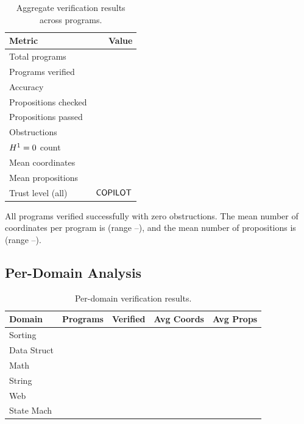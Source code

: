 \documentclass[11pt]{article}
\begin{document}
\begin{table}[H]
\centering
\caption{Aggregate verification results across \expTotalPrograms{}
  programs.}\label{tab:aggregate}
\begin{tabular}{@{}l r@{}}
\toprule
\textbf{Metric} & \textbf{Value} \\
\midrule
Total programs        & \expTotalPrograms{} \\
Programs verified     & \expVerified{} \\
Accuracy              & \expAccuracy{} \\
Propositions checked  & \expPropsSum{} \\
Propositions passed   & \expPropsOkSum{} \\
Obstructions          & \expObstructionTotal{} \\
$H^{1} = 0$ count  & \expHOneZero{} \\
Mean coordinates      & \expCoordsMean{} \\
Mean propositions     & \expPropsMean{} \\
Trust level (all)     & $\mathsf{COPILOT}$ \\
\bottomrule
\end{tabular}
\end{table}

All \expVerified{} programs verified successfully with zero
obstructions.  The mean number of coordinates per program is
\expCoordsMean{} (range \expCoordsMin{}--\expCoordsMax{}),
and the mean number of propositions is \expPropsMean{}
(range \expPropsMin{}--\expPropsMax{}).

\subsection{Per-Domain Analysis}

\begin{table}[H]
\centering
\caption{Per-domain verification results.}\label{tab:domains}
\begin{tabular}{@{}l r r r r@{}}
\toprule
\textbf{Domain} & \textbf{Programs} & \textbf{Verified}
  & \textbf{Avg Coords} & \textbf{Avg Props} \\
\midrule
Sorting     & \expDomainSortCount{} & \expDomainSortVerified{}
  & \expDomainSortAvgCoords{} & \expDomainSortAvgProps{} \\
Data Struct & \expDomainDsCount{} & \expDomainDsVerified{}
  & \expDomainDsAvgCoords{} & \expDomainDsAvgProps{} \\
Math        & \expDomainMathCount{} & \expDomainMathVerified{}
  & \expDomainMathAvgCoords{} & \expDomainMathAvgProps{} \\
String      & \expDomainStrCount{} & \expDomainStrVerified{}
  & \expDomainStrAvgCoords{} & \expDomainStrAvgProps{} \\
Web         & \expDomainWebCount{} & \expDomainWebVerified{}
  & \expDomainWebAvgCoords{} & \expDomainWebAvgProps{} \\
State Mach  & \expDomainSmCount{} & \expDomainSmVerified{}
  & \expDomainSmAvgCoords{} & \expDomainSmAvgProps{} \\
\bottomrule
\end{tabular}
\end{table}
\end{document}
